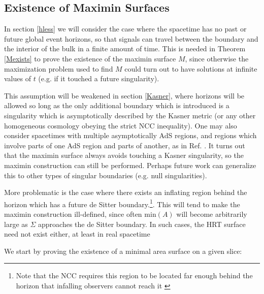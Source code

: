 \documentclass{article}
\begin{document}
\subsection{Existence of Maximin Surfaces}\label{exist}

In section \ref{hless} we will consider the case where the spacetime has no past or future global event horizons, so that signals can travel between the boundary and the interior of the bulk in a finite amount of time.  This is needed in Theorem \ref{Mexists} to prove the existence of the maximin surface $M$, since otherwise the maximization problem used to find $M$ could turn out to have solutions at infinite values of $t$ (e.g. if it touched a future singularity).  

This assumption will be weakened in section \ref{Kasner}, where horizons will be allowed so long as the only additional boundary which is introduced is a singularity which is asymptotically described by the Kasner metric (or any other homogeneous cosmology obeying the strict NCC inequality).  One may also consider spacetimes with multiple asymptotically AdS regions, and regions which involve parts of one AdS region and parts of another, as in Ref. \cite{HM13}.  It turns out that the maximin surface always avoids touching a Kasner singularity, so the maximin construction can still be performed.  Perhaps future work can generalize this to other types of singular boundaries (e.g. null singularities).

More problematic is the case where there exists an inflating region behind the horizon which has a future de Sitter boundary.\footnote{Note that the NCC requires this region to be located far enough behind the horizon that infalling observers cannot reach it \cite{FG87}}.  This will tend to make the maximin construction ill-defined, since often $\mathrm{min}(A)$ will become arbitrarily large as $\Sigma$ approaches the de Sitter boundary.  In such cases, the HRT surface need not exist either, at least in real spacetime \cite{FM14}


We start by proving the existence of a minimal area surface on a given slice:
\end{document}
